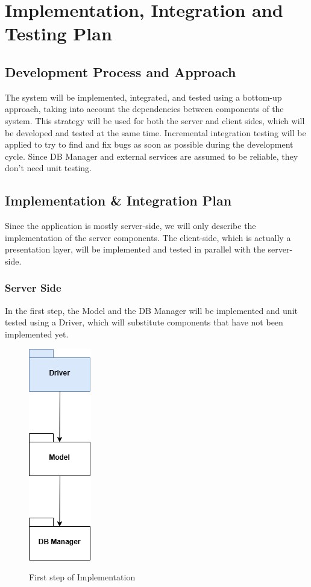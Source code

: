 \documentclass[a4paper,12pt]{article}
\begin{document}
\section{Implementation, Integration and Testing Plan}

\subsection{Development Process and Approach}
The system will be implemented, integrated, and tested using a bottom-up approach, taking
into account the dependencies between components of the system. This strategy will be used
for both the server and client sides, which will be developed and tested at the same time.
Incremental integration testing will be applied to try to find and fix bugs as soon as possible
during the development cycle. Since DB Manager and external services are assumed to be
reliable, they don't need unit testing.
\subsection{Implementation \& Integration Plan}
Since the application is mostly server-side, we will only describe the implementation of
the server components. The client-side, which is actually a presentation layer, will be
implemented and tested in parallel with the server-side.
\subsubsection{Server Side}
In the first step, the Model and the DB Manager will be implemented and unit tested using a Driver, which will substitute components that have not been implemented yet.

\begin{figure}[H]
\centering
\includegraphics[scale = 0.78]{DD_figures/ImplementationDiagrams/FirstStep.png}\\
\caption{First step of Implementation}
\end{figure}
\newpage
\end{document}
